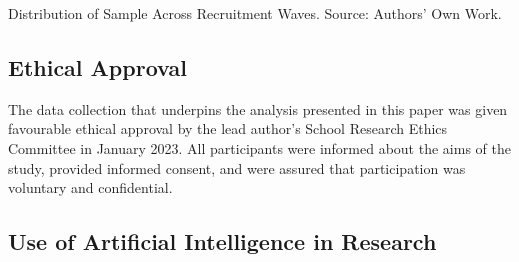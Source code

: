 \documentclass[
  12pt,
  letterpaper,
  DIV=11,
  numbers=noendperiod]{scrartcl}
\theoremstyle{plain}
\theoremstyle{definition}
\begin{document}
\begin{table}

\caption{\label{tbl-wave-distribution}Distribution of Sample Across
Recruitment Waves. Source: Authors' Own Work.}


\end{table}%

\subsection{Ethical Approval}\label{ethical-approval}

The data collection that underpins the analysis presented in this paper
was given favourable ethical approval by the lead author's School
Research Ethics Committee in January 2023. All participants were
informed about the aims of the study, provided informed consent, and
were assured that participation was voluntary and confidential.

\subsection{Use of Artificial Intelligence in
Research}\label{use-of-artificial-intelligence-in-research}
\end{document}
